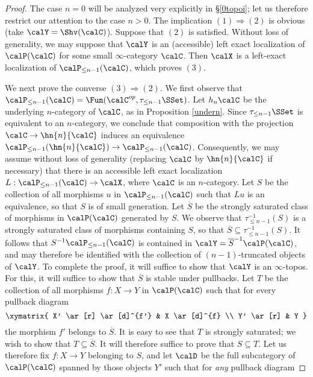 \begin{proof}
The case $n=0$ will be analyzed very explicitly in \S \ref{0topoi}; let us therefore restrict our attention to the case $n > 0$.
The implication $(1) \Rightarrow (2)$ is obvious (take $\calY = \Shv(\calC)$). Suppose
that $(2)$ is satisfied. Without loss of generality, we may suppose that $\calY$ is an (accessible) left exact localization of $\calP(\calC)$ for some small $\infty$-category $\calC$. Then
$\calX$ is a left-exact localization of $\calP_{\leq n-1}(\calC)$, which proves $(3)$.

We next prove the converse $(3) \Rightarrow (2)$. We first observe that
$\calP_{\leq n-1}(\calC) = \Fun( \calC^{op}, \tau_{\leq n-1} \SSet)$. Let $h_n \calC$ be the underlying $n$-category of $\calC$, as in Proposition \ref{undern}. Since $\tau_{\leq n-1} \SSet$
is equivalent to an $n$-category, we conclude that composition with the projection
$\calC \rightarrow \hn{n}{\calC}$ induces an equivalence $\calP_{\leq n-1}(\hn{n}{\calC}) \rightarrow \calP_{\leq n-1}(\calC)$. Consequently, we may assume without loss of generality (replacing $\calC$ by $\hn{n}{\calC}$ if necessary) that there is an accessible left exact localization $L: \calP_{\leq n-1}(\calC) \rightarrow \calX$, where $\calC$ is an $n$-category. Let $S$ be the collection of all morphisms $u$ in $\calP_{\leq n-1}(\calC)$ such that $Lu$ is an equivalence, so that $S$ is of small generation. Let
$\overline{S}$ be the strongly saturated class of morphisms in $\calP(\calC)$ generated by $S$.
We observe that $\tau_{\leq n-1}^{-1}(S)$ is a strongly saturated class of morphisms containing
$S$, so that $\overline{S} \subseteq \tau_{\leq n-1}^{-1}(S)$. It follows that $S^{-1} \calP_{\leq n-1}(\calC)$
is contained in $\calY = \overline{S}^{-1} \calP(\calC)$, and may therefore be identified with the collection of $(n-1)$-truncated objects of $\calY$. To complete the proof, it will suffice to show that $\calY$ is an $\infty$-topos. For this, it will suffice to show that $\overline{S}$ is stable under pullbacks. Let $T$ be the collection of all morphisms $f: X \rightarrow Y$ in $\calP(\calC)$ such that
for every pullback diagram
$$ \xymatrix{ X' \ar[r] \ar[d]^{f'} & X \ar[d]^{f} \\
Y' \ar[r] & Y }$$
the morphism $f'$ belongs to $\overline{S}$. It is easy to see that $T$ is strongly saturated; we wish to show that $T \subseteq \overline{S}$. It will therefore suffice to prove that $S \subseteq T$. Let us therefore fix $f:X \rightarrow Y$ belonging to $S$, and let $\calD$ be the full subcategory of $\calP(\calC)$ spanned by those objects $Y'$ such that for {\em any} pullback diagram

\end{proof}
